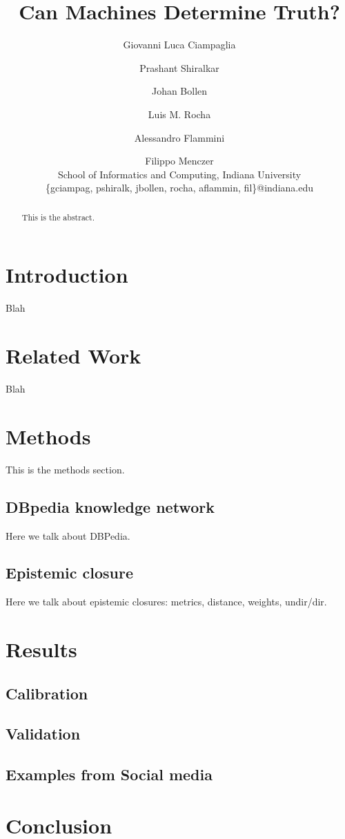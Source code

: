 \documentclass{article}
\author{
	Giovanni Luca Ciampaglia \and
	Prashant Shiralkar \and
	Johan Bollen \and
	Luis M. Rocha \and
	Alessandro Flammini \and
	Filippo Menczer \\
School of Informatics and Computing, Indiana University\\
{\small \{gciampag, pshiralk, jbollen, rocha, aflammin, fil\}@indiana.edu}
}
\title{Can Machines Determine Truth?}
\date{}
\begin{document}
\maketitle

\begin{abstract}
	This is the abstract.
\end{abstract}

\section{Introduction}

Blah

\section{Related Work}

Blah

\section{Methods}

This is the methods section.

\subsection{DBpedia knowledge network}

Here we talk about DBPedia.

\subsection{Epistemic closure}

Here we talk about epistemic closures: metrics, distance, weights, undir/dir.

\section{Results}

\subsection{Calibration}

\subsection{Validation}

\subsection{Examples from Social media}

\section{Conclusion}
\end{document}
